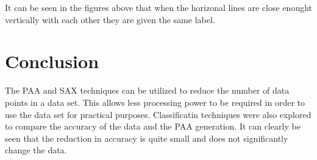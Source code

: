 \documentclass{article}
\begin{document}
It can be seen in the figures above that when the horizonal lines are close 
enought vertically with each other they are given the same label.

\section{Conclusion}
The PAA and SAX techniques can be utilized to reduce the number of data points 
in a data set.  This allows less processing power to be required in order to use
the data set for practical purposes.
\newline
\noindent
Classificatin techniques were also explored to compare the accuracy of the data
and the PAA generation.  It can clearly be seen that the reduction in accuracy 
is quite small and does not significantly change the data.
\end{document}
